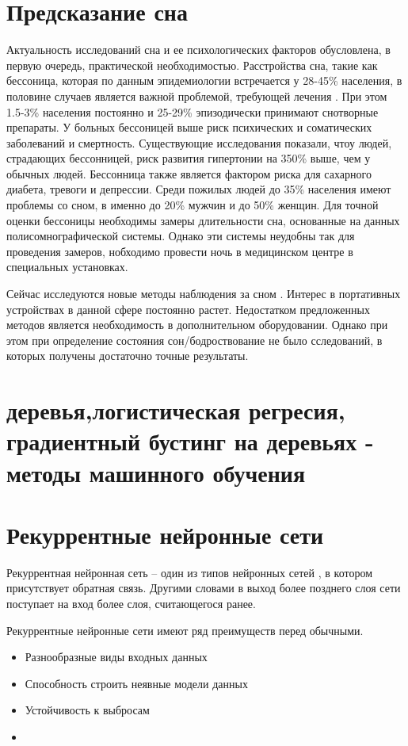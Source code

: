 \section{Предсказание сна}
Актуальность исследований сна и ее психологических факторов обусловлена, в первую очередь, практической необходимостью. 
Расстройства сна, такие как бессоница, которая по данным эпидемиологии встречается у 28-45\% населения, в половине случаев является важной проблемой, требующей лечения \cite{sleep3}.
При этом 1.5-3\% населения постоянно и 25-29\% эпизодически принимают снотворные препараты. 
У больных бессоницей выше риск психических и соматических заболеваний и смертность. Существующие исследования показали, чтоу людей, страдающих бессонницей, риск развития гипертонии на 350\% выше, чем у обычных людей. 
Бессонница также является фактором риска для сахарного диабета, тревоги и депрессии.
Среди пожилых людей до 35\% населения имеют проблемы со сном, в именно до 20\% мужчин и до 50\% женщин. \cite {sleep1, sleep2}
Для точной оценки бессоницы необходимы замеры длительности сна, основанные на данных полисомнографической системы. 
Однако эти системы неудобны так для проведения замеров, нобходимо провести ночь в медицинском центре в специальных установках.

Сейчас исследуются новые методы наблюдения за сном \cite{monitor_sleep, monitor_sleep2, monitor_sleep3}. Интерес в портативных устройствах в данной сфере постоянно растет.
Недостатком предложенных методов является необходимость в дополнительном оборудовании. Однако при этом при определение состояния сон/бодроствование не было  сследований, в которых получены достаточно точные результаты.

\section{деревья,логистическая регресия, градиентный бустинг на деревьях - методы машинного обучения}

\section{Рекуррентные нейронные сети}
Рекуррентная нейронная сеть – один из типов нейронных сетей \cite{neural_network}, в котором присутствует обратная связь. Другими словами в выход более позднего слоя сети поступает на вход более слоя, считающегося ранее.

Рекуррентные нейронные сети имеют ряд преимуществ перед обычными.
\begin{itemize}
	\item Разнообразные виды входных данных
	\item Способность строить неявные модели данных
	\item Устойчивость к выбросам
	\item 
\end{itemize}

